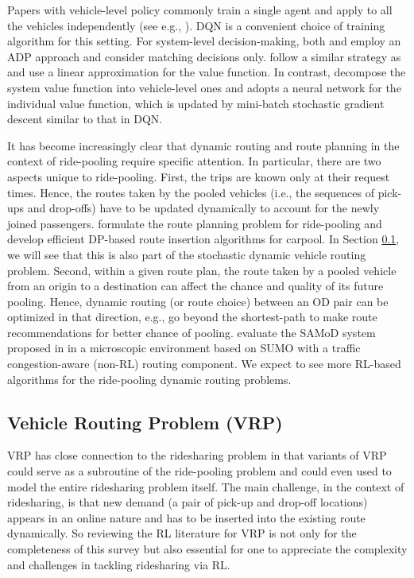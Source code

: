 \documentclass{article}
\newcommand{\tq}[1]{\textcolor{red}{#1}}
\begin{document}
Papers with vehicle-level policy commonly train a single agent and apply to all the vehicles independently (see e.g., \citep{haliem2020distributed}).
DQN is a convenient choice of training algorithm for this setting. For system-level decision-making, both \cite{yu2019integrated} and \cite{shah2020neural} employ an ADP approach and consider matching decisions only. \cite{yu2019integrated} follow a similar strategy as \citep{simao2009approximate} and use a linear approximation for the value function. In contrast, \cite{shah2020neural} decompose the system value function into vehicle-level ones and adopts a neural network for the individual value function, which is updated by mini-batch stochastic gradient descent similar to that in DQN. 

It has become increasingly clear that dynamic routing and route planning in the context of ride-pooling require specific attention. In particular, there are two aspects unique to ride-pooling. First, the trips are known only at their request times. Hence, the routes taken by the pooled vehicles (i.e., the sequences of pick-ups and drop-offs) have to be updated dynamically to account for the newly joined passengers. \cite{tong2018unified, xu2020efficient} formulate the route planning problem for ride-pooling and develop efficient DP-based route insertion algorithms for carpool. In Section \ref{sec:vrp}, we will see that this is also part of the stochastic dynamic vehicle routing problem. Second, within a given route plan, the route taken by a pooled vehicle from an origin to a destination can affect the chance and quality of its future pooling. Hence, dynamic routing (or route choice) between an OD pair can be optimized in that direction, e.g.,  \cite{yuen2019beyond} go beyond the shortest-path to make route recommendations for better chance of pooling. \cite{gueriau2020shared} evaluate the SAMoD system proposed in \citep{gueriau2018samod} in a microscopic environment based on SUMO with a traffic congestion-aware (non-RL) routing component. We expect to see more RL-based algorithms for the ride-pooling dynamic routing problems.



\subsection{Vehicle Routing Problem (VRP)}\label{sec:vrp}
VRP has close connection to the ridesharing problem in that variants of VRP could serve as a subroutine of the ride-pooling problem and could even used to model the entire ridesharing problem itself. The main challenge, in the context of ridesharing, is that new demand (a pair of pick-up and drop-off locations) appears in an online nature and has to be inserted into the existing route dynamically. So reviewing the RL literature for VRP is not only for the completeness of this survey but also essential for one to appreciate the complexity and challenges in tackling ridesharing via RL.
\end{document}
